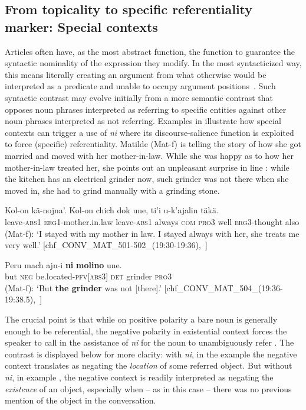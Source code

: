 \documentclass[output=paper
,modfonts
,nonflat]{langsci/langscibook}
\begin{document}
\subsection{From topicality to specific referentiality marker: Special contexts}\label{sec:pico:4.3}

Articles often have, as the most abstract function, the function to guarantee the syntactic nominality of the expression they modify. In the most syntacticized way, this means literally creating an argument from what otherwise would be interpreted as a predicate and unable to occupy argument positions~\citep[176]{Gillon2015}. Such syntactic contrast may evolve initially from a more semantic contrast that opposes noun phrases interpreted as referring to specific entities against other noun phrases interpreted as not referring.
Examples in  illustrate how special contexts can trigger a use of \textit{ni} where its discourse-salience function is exploited to force (specific) referentiality. Matilde (Mat-f) is telling the story of how she got married and moved with her mother-in-law. While she was happy as to how her mother-in-law treated her, she points out an unpleasant surprise in line : while the kitchen has an electrical grinder now, such grinder was not there when she moved in, she had to grind manually with a grinding stone.


\ea \label{ex:pico:56}

\ea \label{ex:pico:56a}
\gll Kol-on kä-nojna'. Kol-on chich dok une, ti'i u-k'ajalin täkä.\\
leave-{\textsc{abs1}} {\textsc{erg1}}-mother.in.law leave-{\textsc{abs1}} always {\textsc{com}} \textsc{pro3} well {\textsc{erg3}}-thought also\\
\glt (Mat-f): `I stayed with my mother in law. I stayed always with her, she treats me very well.' [chf\_CONV\_MAT\_501-502\_(19:30-19:36),~\citealt{Delgado-Galvan2018archive}]

\ex \label{ex:pico:56b}
\gll Peru mach ajn-i \textbf{ni} \textbf{molino} une.
\\
but \textsc{neg} be.located-{\textsc{pfv[abs3]}} \textsc{det} grinder {\textsc{pro3}}\\
\glt (Mat-f): `But \textbf{the grinder} was not [there].' [chf\_CONV\_MAT\_504\_(19:36-19:38.5),~\citealt{Delgado-Galvan2018archive}]
\z
\z

The crucial point is that while on positive polarity a bare noun is generally enough to be referential, the negative polarity in existential context forces the speaker to call in the assistance of \textit{ni} for the noun to unambiguously refer . The contrast is displayed below for more clarity: with \textit{ni}, in the example  the negative context translates as negating the \textit{location} of some referred object. But without \textit{ni}, in example , the negative context is readily interpreted as negating the \textit{existence} of an object, especially when -- as in this case -- there was no previous mention of the object in the conversation.
\end{document}
